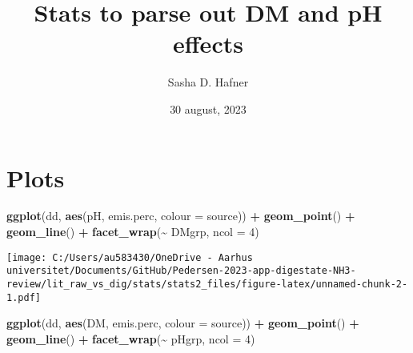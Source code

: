 \documentclass[
]{article}
\title{Stats to parse out DM and pH effects}
\author{Sasha D. Hafner}
\date{30 august, 2023}
\newenvironment{Shaded}{\begin{snugshade}}{\end{snugshade}}
\newcommand{\AttributeTok}[1]{\textcolor[rgb]{0.13,0.29,0.53}{#1}}
\newcommand{\DecValTok}[1]{\textcolor[rgb]{0.00,0.00,0.81}{#1}}
\newcommand{\FunctionTok}[1]{\textcolor[rgb]{0.13,0.29,0.53}{\textbf{#1}}}
\newcommand{\NormalTok}[1]{#1}
\newcommand{\OtherTok}[1]{\textcolor[rgb]{0.56,0.35,0.01}{#1}}
\newcommand{\SpecialCharTok}[1]{\textcolor[rgb]{0.81,0.36,0.00}{\textbf{#1}}}
\begin{document}
\maketitle

\hypertarget{plots}{%
\section{Plots}\label{plots}}

\begin{Shaded}
\end{Shaded}

\begin{Shaded}
\begin{Highlighting}[]
\FunctionTok{ggplot}\NormalTok{(dd, }\FunctionTok{aes}\NormalTok{(pH, emis.perc, }\AttributeTok{colour =}\NormalTok{ source)) }\SpecialCharTok{+}
  \FunctionTok{geom\_point}\NormalTok{() }\SpecialCharTok{+}
  \FunctionTok{geom\_line}\NormalTok{() }\SpecialCharTok{+}
  \FunctionTok{facet\_wrap}\NormalTok{(}\SpecialCharTok{\textasciitilde{}}\NormalTok{ DMgrp, }\AttributeTok{ncol =} \DecValTok{4}\NormalTok{)}
\end{Highlighting}
\end{Shaded}

\texttt{[image: C:/Users/au583430/OneDrive - Aarhus universitet/Documents/GitHub/Pedersen-2023-app-digestate-NH3-review/lit\_raw\_vs\_dig/stats/stats2\_files/figure-latex/unnamed-chunk-2-1.pdf]}

\begin{Shaded}
\begin{Highlighting}[]
\FunctionTok{ggplot}\NormalTok{(dd, }\FunctionTok{aes}\NormalTok{(DM, emis.perc, }\AttributeTok{colour =}\NormalTok{ source)) }\SpecialCharTok{+}
  \FunctionTok{geom\_point}\NormalTok{() }\SpecialCharTok{+}
  \FunctionTok{geom\_line}\NormalTok{() }\SpecialCharTok{+}
  \FunctionTok{facet\_wrap}\NormalTok{(}\SpecialCharTok{\textasciitilde{}}\NormalTok{ pHgrp, }\AttributeTok{ncol =} \DecValTok{4}\NormalTok{)}
\end{Highlighting}
\end{Shaded}
\end{document}
